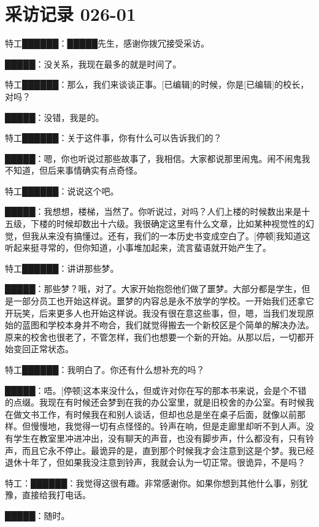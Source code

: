 \section[采访记录 026-01]{
    采访记录 026-01
}

\label{sec:DOC-interview-log-026-01}


特工██████：█████先生，感谢你拨冗接受采访。

█████：没关系，我现在最多的就是时间了。

特工██████：那么，我们来谈谈正事。{[}已编辑]的时候，你是{[}已编辑]的校长，对吗？

█████：没错，我是的。

特工██████：关于这件事，你有什么可以告诉我们的？

█████：嗯，你也听说过那些故事了，我相信。大家都说那里闹鬼。闹不闹鬼我不知道，但后来事情确实有点奇怪。

特工██████：说说这个吧。

█████：我想想，楼梯，当然了。你听说过，对吗？人们上楼的时候数出来是十五级，下楼的时候却数出十六级。我很确定这里有什么文章，比如某种视觉性的幻觉，但我从来没有搞懂过。还有，我们的一本历史书变成空白了。{[}停顿]我知道这听起来挺寻常的，但你知道，小事堆加起来，流言蜚语就开始产生了。

特工██████：讲讲那些梦。

█████：那些梦？哦，对了。大家开始抱怨他们做了噩梦。大部分都是学生，但是一部分员工也开始这样说。噩梦的内容总是永不放学的学校。一开始我们还拿它开玩笑，后来更多人也开始这样说。我没有很在意这些事，但，嗯，当我们发现原始的蓝图和学校本身并不吻合，我们就觉得搬去一个新校区是个简单的解决办法。原来的校舍也很老了，不管怎样，我们也想要一个新的开始。从那以后，一切都开始变回正常状态。

特工██████：我明白了。你还有什么想补充的吗？

█████：唔。{[}停顿]这本来没什么，但或许对你在写的那本书来说，会是个不错的点缀。我现在有时候还会梦到在我的办公室里，就是旧校舍的办公室。有时候我在做文书工作，有时候我在和别人谈话，但却也总是坐在桌子后面，就像以前那样。但慢慢地，我觉得一切有点怪怪的。铃声在响，但是走廊里却听不到人声。没有学生在教室里冲进冲出，没有聊天的声音，也没有脚步声，什么都没有，只有铃声，而且它永不停止。最诡异的是，直到那个时候我才会注意到这是个梦。我已经退休十年了，但如果我没注意到铃声，我就会认为一切正常。很诡异，不是吗？

特工：██████：我觉得这很有趣。非常感谢你。如果你想到其他什么事，别犹豫，直接给我打电话。

█████：随时。
